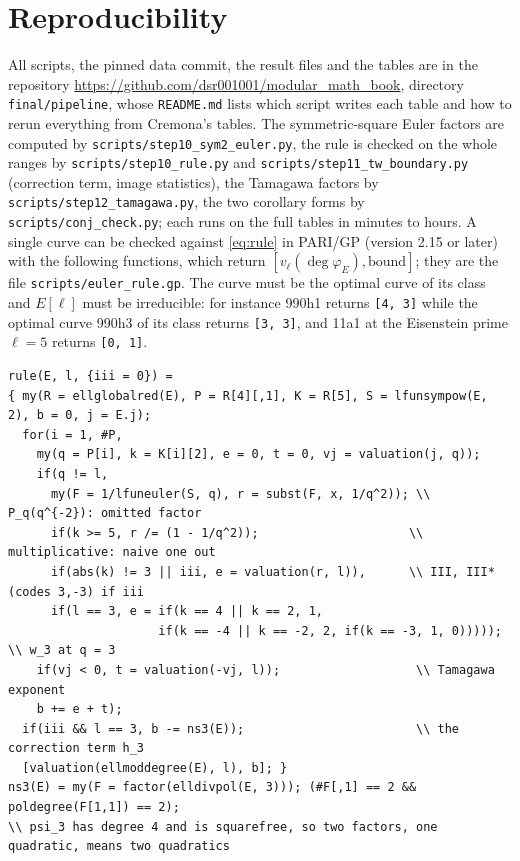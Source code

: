 \documentclass[11pt]{amsart}
\theoremstyle{definition}
\newcommand{\degphi}{\deg\varphi_E}
\begin{document}
\appendix
\section{Reproducibility}\label{app:repro}
All scripts, the pinned data commit, the result files and the tables are in the repository \url{https://github.com/dsr001001/modular_math_book}, directory \texttt{final/\allowbreak pipeline}, whose \texttt{README.md} lists which script writes each table and how to rerun everything from Cremona's tables. The symmetric-square Euler factors are computed by \texttt{scripts/step10\_sym2\_euler.py}, the rule is checked on the whole ranges by \texttt{scripts/\allowbreak step10\_rule.py} and \texttt{scripts/\allowbreak step11\_tw\_boundary.py} (correction term, image statistics), the Tamagawa factors by \texttt{scripts/step12\_tamagawa.py}, the two corollary forms by \texttt{scripts/conj\_check.py}; each runs on the full tables in minutes to hours. A single curve can be checked against \eqref{eq:rule} in PARI/GP (version 2.15 or later) with the following functions, which return $[v_\ell(\degphi),\text{bound}]$; they are the file \texttt{scripts/euler\_rule.gp}. The curve must be the optimal curve of its class and $E[\ell]$ must be irreducible: for instance 990h1 returns \texttt{[4, 3]} while the optimal curve 990h3 of its class returns \texttt{[3, 3]}, and 11a1 at the Eisenstein prime $\ell=5$ returns \texttt{[0, 1]}.
{\footnotesize\begin{verbatim}
rule(E, l, {iii = 0}) =
{ my(R = ellglobalred(E), P = R[4][,1], K = R[5], S = lfunsympow(E, 2), b = 0, j = E.j);
  for(i = 1, #P,
    my(q = P[i], k = K[i][2], e = 0, t = 0, vj = valuation(j, q));
    if(q != l,
      my(F = 1/lfuneuler(S, q), r = subst(F, x, 1/q^2)); \\ P_q(q^{-2}): omitted factor
      if(k >= 5, r /= (1 - 1/q^2));                     \\ multiplicative: naive one out
      if(abs(k) != 3 || iii, e = valuation(r, l)),      \\ III, III* (codes 3,-3) if iii
      if(l == 3, e = if(k == 4 || k == 2, 1,
                     if(k == -4 || k == -2, 2, if(k == -3, 1, 0)))));   \\ w_3 at q = 3
    if(vj < 0, t = valuation(-vj, l));                   \\ Tamagawa exponent
    b += e + t);
  if(iii && l == 3, b -= ns3(E));                        \\ the correction term h_3
  [valuation(ellmoddegree(E), l), b]; }
ns3(E) = my(F = factor(elldivpol(E, 3))); (#F[,1] == 2 && poldegree(F[1,1]) == 2);
\\ psi_3 has degree 4 and is squarefree, so two factors, one quadratic, means two quadratics
\end{verbatim}}
\end{document}
